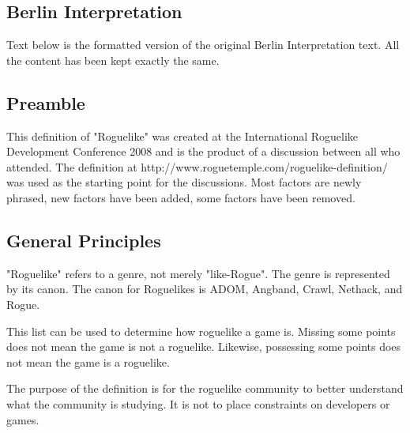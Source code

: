 \documentclass{article}
\begin{document}
\subsection{Berlin Interpretation}

Text below is the formatted version of the original Berlin Interpretation text. All the content has been kept exactly the same.

\subsection*{Preamble}

This definition of "Roguelike" was created at the International 
Roguelike Development Conference 2008 and is the product of a 
discussion between all who attended. The definition at 
http://www.roguetemple.com/roguelike-definition/ was used as the 
starting point for the discussions. Most factors are newly phrased, 
new factors have been added, some factors have been removed.

\subsection*{General Principles}
 
"Roguelike" refers to a genre, not merely "like-Rogue". The genre is 
represented by its canon. The canon for Roguelikes is ADOM, Angband, 
Crawl, Nethack, and Rogue. 
 
This list can be used to determine how roguelike a game is. Missing 
some points does not mean the game is not a roguelike. Likewise, 
possessing some points does not mean the game is a roguelike.  
 
The purpose of the definition is for the roguelike community to better 
understand what the community is studying. It is not to place 
constraints on developers or games. 
\end{document}
